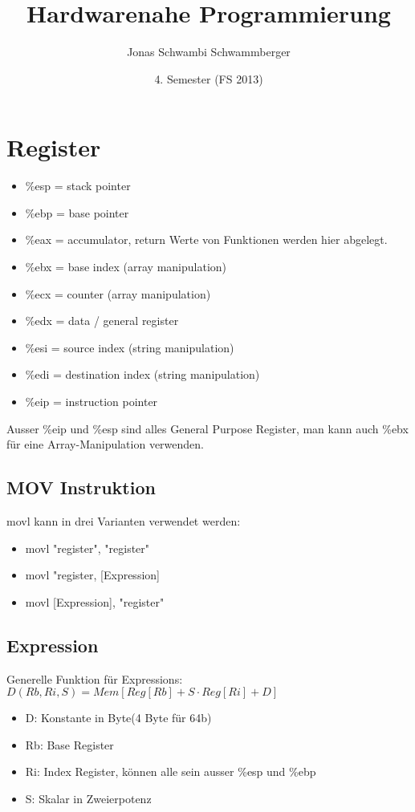 \documentclass[a4paper, 11pt]{article}
\title{
	\vspace{5cm}
	Hardwarenahe Programmierung
}
\author{Jonas Schwambi Schwammberger}
\date{4. Semester (FS 2013)}
\begin{document}
\maketitle
\pagebreak
\tableofcontents
\pagebreak

\section{Register}
\begin{itemize}
	\item \%esp = stack pointer
	\item \%ebp = base pointer
	\item \%eax = accumulator, return Werte von Funktionen werden hier abgelegt.
	\item \%ebx = base index (array manipulation)
	\item \%ecx = counter (array manipulation)
	\item \%edx = data / general register
	\item \%esi = source index (string manipulation)
	\item \%edi = destination index (string manipulation)
	\item \%eip = instruction pointer
\end{itemize}
Ausser \%eip und \%esp sind alles General Purpose Register, man kann auch \%ebx für eine Array-Manipulation verwenden.

\subsection{MOV Instruktion}
movl kann in drei Varianten verwendet werden:
\begin{itemize}
	\item movl "register", "register"
	\item movl "register, [Expression]
	\item movl [Expression], "register"
\end{itemize}

\subsection{Expression}
Generelle Funktion für Expressions: $D(Rb,Ri,S)= Mem[Reg[Rb]+S \cdot Reg[Ri]+D]$\\
\begin{itemize}
	\item D: Konstante in Byte(4 Byte für 64b)
	\item Rb: Base Register
	\item Ri: Index Register, können alle sein ausser \%esp und \%ebp
	\item S: Skalar in Zweierpotenz
\end{itemize}
\end{document}
